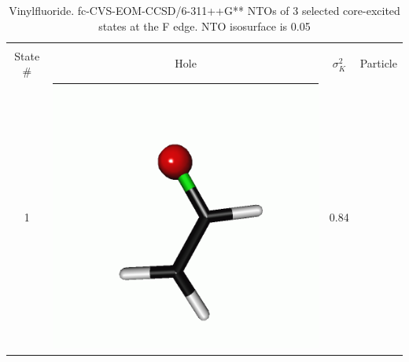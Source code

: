 \documentclass[journal=jctcce,manuscript=article]{achemso}
\begin{document}
\begin{table}[H]
 \centering
 \caption{Vinylfluoride. fc-CVS-EOM-CCSD/6-311++G** 
 NTOs of 3 selected core-excited states at the F edge. 
 NTO isosurface is 0.05\label{vinylfluoride-ntos-Fedge}
 \label{NTOs:fluorine}}
 \vspace{3em}
 \begin{tabular}{ c | c c c }
     \hline
             & \multicolumn{3}{c}{} \\
     State \# &  Hole & $\sigma_K^2$ & Particle \\
     \hline
     1 &  
     \begin{minipage}{0.2\textwidth}
         \centering
         \includegraphics[scale=0.10]{NTO/CH2CHF/CH2CHF_F_1h.png}
     \end{minipage}
     & 0.84
     &  \begin{minipage}{0.2\textwidth}
         \centering

\end{minipage}
\end{tabular}
\end{table}
\end{document}
